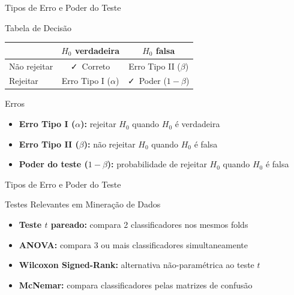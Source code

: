 \documentclass[aspectratio=169]{beamer}
\begin{document}
\begin{frame}{Tipos de Erro e Poder do Teste}
    \begin{block}{Tabela de Decisão}
        \begin{center}\footnotesize
        \begin{tabular}{lcc}
        \toprule
        & $H_0$ verdadeira & $H_0$ falsa \\
        \midrule
        Não rejeitar & \textcolor{minegreen}{\faCheck\ Correto} & \textcolor{minered}{Erro Tipo II ($\beta$)} \\
        Rejeitar     & \textcolor{minered}{Erro Tipo I ($\alpha$)} & \textcolor{minegreen}{\faCheck\ Poder ($1-\beta$)} \\
        \bottomrule
        \end{tabular}
        \end{center}
    \end{block}
    \pause
    \begin{alertblock}{Erros}
        \footnotesize
        \begin{itemize}
            \item \textbf{Erro Tipo I ($\alpha$):} rejeitar $H_0$ quando $H_0$ é verdadeira
            \item \textbf{Erro Tipo II ($\beta$):} não rejeitar $H_0$ quando $H_0$ é falsa
            \item \textbf{Poder do teste ($1-\beta$):} probabilidade de rejeitar $H_0$ quando $H_0$ é falsa
        \end{itemize}
    \end{alertblock}
    
\end{frame}

\begin{frame}{Tipos de Erro e Poder do Teste}
    
    \begin{block}{Testes Relevantes em Mineração de Dados}
        \begin{itemize}\footnotesize
            \item \textbf{Teste $t$ pareado:} compara 2 classificadores nos mesmos folds
            \item \textbf{ANOVA:} compara 3 ou mais classificadores simultaneamente
            \item \textbf{Wilcoxon Signed-Rank:} alternativa não-paramétrica ao teste $t$
            \item \textbf{McNemar:} compara classificadores pelas matrizes de confusão
        \end{itemize}
    \end{block}
\end{frame}
\end{document}
